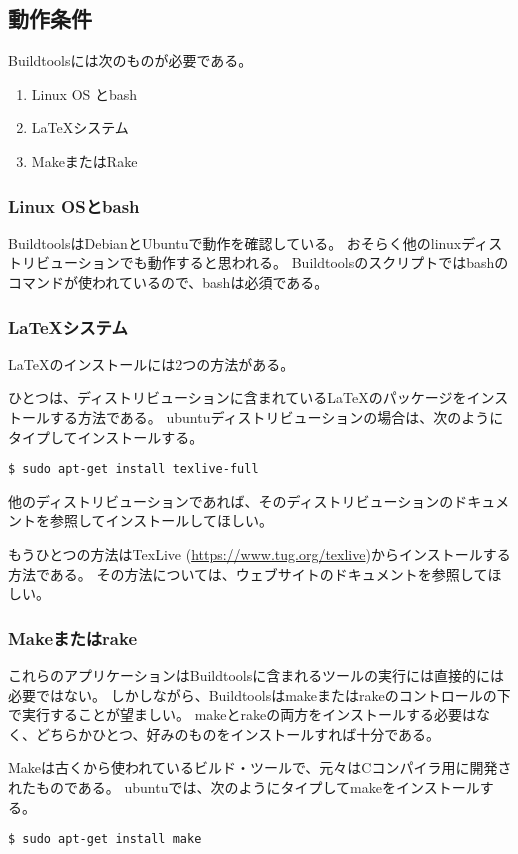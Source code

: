 \subsection{動作条件}
Buildtoolsには次のものが必要である。
\begin{enumerate}
\item Linux OS とbash
\item LaTeXシステム
\item MakeまたはRake
\end{enumerate}

\subsubsection{Linux OSとbash}
BuildtoolsはDebianとUbuntuで動作を確認している。
おそらく他のlinuxディストリビューションでも動作すると思われる。
Buildtoolsのスクリプトではbashのコマンドが使われているので、bashは必須である。
\subsubsection{LaTeXシステム}
LaTeXのインストールには2つの方法がある。

ひとつは、ディストリビューションに含まれているLaTeXのパッケージをインストールする方法である。
ubuntuディストリビューションの場合は、次のようにタイプしてインストールする。
\begin{verbatim}
$ sudo apt-get install texlive-full
\end{verbatim}
他のディストリビューションであれば、そのディストリビューションのドキュメントを参照してインストールしてほしい。

もうひとつの方法はTexLive (\url{https://www.tug.org/texlive})からインストールする方法である。
その方法については、ウェブサイトのドキュメントを参照してほしい。

\subsubsection{Makeまたはrake}
これらのアプリケーションはBuildtoolsに含まれるツールの実行には直接的には必要ではない。
しかしながら、Buildtoolsはmakeまたはrakeのコントロールの下で実行することが望ましい。
makeとrakeの両方をインストールする必要はなく、どちらかひとつ、好みのものをインストールすれば十分である。

Makeは古くから使われているビルド・ツールで、元々はCコンパイラ用に開発されたものである。
ubuntuでは、次のようにタイプしてmakeをインストールする。
\begin{verbatim}
$ sudo apt-get install make
\end{verbatim}

